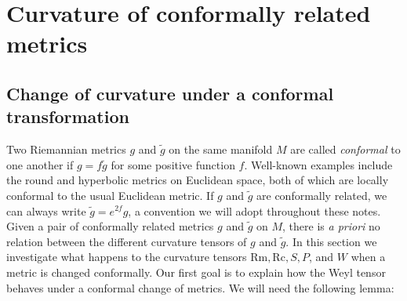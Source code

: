 \documentclass{amsart}
\numberwithin{equation}{section}
\newcommand{\Rc}{\mathrm{Rc}}
\newcommand{\Rm}{\mathrm{Rm}}
\theoremstyle{plain}
\theoremstyle{definition}
\theoremstyle{remark}
\begin{document}
\section{Curvature of conformally related metrics}

\subsection{Change of curvature under a conformal transformation} 
Two Riemannian metrics $g$ and $\tilde{g}$ on the same manifold $M$ are called \emph{conformal} to one another if $g = f \tilde{g}$ for some positive function $f$. Well-known examples include the round and hyperbolic metrics on Euclidean space, both of which are locally conformal to the usual Euclidean metric. If $g$ and $\tilde{g}$ are conformally related, we can always write $\tilde{g} = e^{2f}g$, a convention we will adopt throughout these notes. Given a pair of conformally related metrics $g$ and $\tilde{g}$ on $M$, there is \emph{a priori} no relation between the different curvature tensors of $g$ and $\tilde{g}$. In this section we investigate what happens to the curvature tensors $\Rm, \Rc, S, P$, and $W$ when a metric is changed conformally. Our first goal is to explain how the Weyl tensor behaves under a conformal change of metrics. We will need the following lemma:
\end{document}
